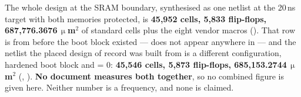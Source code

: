 The whole design at the SRAM boundary, synthesised as one netlist at the
20\,ns target with both memories protected, is \textbf{45{,}952 cells,
5{,}833 flip-flops, 687{,}776.3676\,$\upmu$m$^2$} of standard cells plus
the eight vendor macros (). That row is from
before the boot block existed ---  does not appear
anywhere in  --- and the netlist the placed design of record
was built from is a different configuration, hardened boot block and
 = 0: \textbf{45{,}546 cells, 5{,}873 flip-flops,
685{,}153.2744\,$\upmu$m$^2$} (,
). \textbf{No document measures both together},
so no combined figure is given here.
Neither number is a frequency, and none is claimed.
